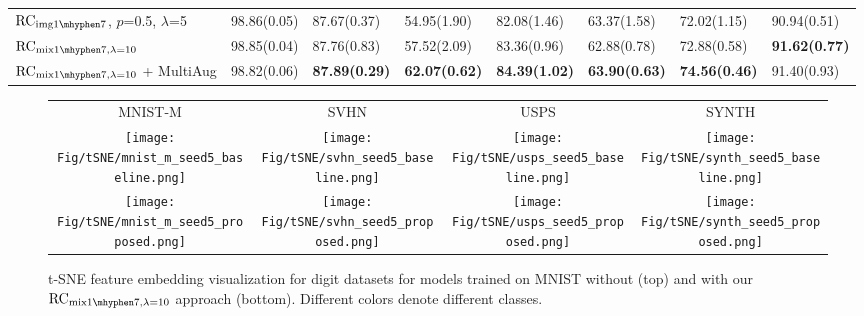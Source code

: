 \documentclass{article} \usepackage{iclr2021_conference,times}
\begin{document}
\begin{table}[th]
\begin{tabular}{l|l|lllll|l}
$\text{RC}_{\text{img}{1\mhyphen7}}$\tiny, $p$=0.5, $\lambda$=5    & 98.86\tiny(0.05) & 87.67\tiny(0.37)          & 54.95\tiny(1.90)          & 82.08\tiny(1.46)          & {63.37\tiny(1.58)}          & 72.02\tiny(1.15)          & 90.94\tiny(0.51)\\
		$\text{RC}_{\text{mix}1\mhyphen7,\lambda=10}$ & 98.85\tiny(0.04) & 87.76\tiny(0.83) & {57.52\tiny(2.09)} & {83.36\tiny(0.96)} & 62.88\tiny(0.78) & {72.88\tiny(0.58)} & \textbf{91.62\tiny(0.77)} \\
		{$\text{RC}_{\text{mix}1\mhyphen7,\lambda=10}$ + \scriptsize MultiAug} & 98.82\tiny(0.06) & \textbf{87.89\tiny(0.29)} & \textbf{62.07\tiny(0.62)} & \textbf{84.39\tiny(1.02)} & \textbf{63.90\tiny(0.63)} & \textbf{74.56\tiny(0.46)} &  91.40\tiny(0.93) \\
		
		\bottomrule
	\end{tabular}
\end{table}



\begin{figure}[th]
	\begin{center}
		\small
\newcommand\cwidth{0.25\textwidth}
		\begin{adjustbox}{max width=\textwidth}
			\begin{tabular}{cccc}
MNIST-M    & SVHN        & USPS   & SYNTH \\
\texttt{[image: Fig/tSNE/mnist\_m\_seed5\_baseline.png]}
				& \texttt{[image: Fig/tSNE/svhn\_seed5\_baseline.png]}
				& \texttt{[image: Fig/tSNE/usps\_seed5\_baseline.png]}
				& \texttt{[image: Fig/tSNE/synth\_seed5\_baseline.png]}
				\\
\texttt{[image: Fig/tSNE/mnist\_m\_seed5\_proposed.png]}
				& \texttt{[image: Fig/tSNE/svhn\_seed5\_proposed.png]}
				& \texttt{[image: Fig/tSNE/usps\_seed5\_proposed.png]}
				& \texttt{[image: Fig/tSNE/synth\_seed5\_proposed.png]}
				\\
			\end{tabular}
		\end{adjustbox}
	\end{center}
\caption{t-SNE feature embedding visualization for digit datasets for models trained on MNIST without (top) and with our $\text{RC}_{\text{mix}{1\mhyphen7},\lambda=10}$ approach (bottom). Different colors denote different classes.}  
\label{fig:feat_tsne}
\end{figure}
\end{document}

